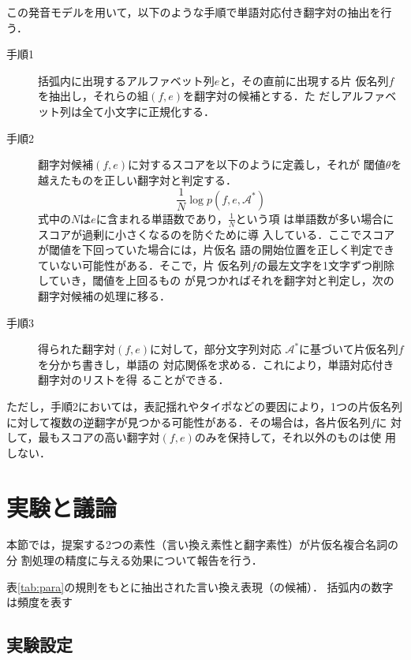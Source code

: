 \documentclass[japanese]{jnlp_1.4}
\begin{document}
この発音モデルを用いて，以下のような手順で単語対応付き翻字対の抽出を行う．
\begin{description}
 \item[手順1]
	    括弧内に出現するアルファベット列$e$と，その直前に出現する片
	    仮名列$f$を抽出し，それらの組$(f,e)$を翻字対の候補とする．た
	    だしアルファベット列は全て小文字に正規化する．
 \item[手順2]
	    翻字対候補$(f,e)$に対するスコアを以下のように定義し，それが
	    閾値$\theta$を越えたものを正しい翻字対と判定する．
	    \[
	    \frac{1}{N}\log p(f,e,\mathcal{A}^{*})
	    \]
	    式中の$N$は$e$に含まれる単語数であり，$\frac{1}{N}$という項
	    は単語数が多い場合にスコアが過剰に小さくなるのを防ぐために導
	    入している．ここでスコアが閾値を下回っていた場合には，片仮名
	    語の開始位置を正しく判定できていない可能性がある．そこで，片
	    仮名列$f$の最左文字を1文字ずつ削除していき，閾値を上回るもの
	    が見つかればそれを翻字対と判定し，次の翻字対候補の処理に移る．	    
	    
 \item[手順3]
	    得られた翻字対$(f,e)$に対して，部分文字列対応
	    $\mathcal{A}^{*}$に基づいて片仮名列$f$を分かち書きし，単語の
	    対応関係を求める．これにより，単語対応付き翻字対のリストを得
	    ることができる．
\end{description}

\noindent
ただし，手順2においては，表記揺れやタイポなどの要因により，1つの片仮名列
に対して複数の逆翻字が見つかる可能性がある．その場合は，各片仮名列$f$に
対して，最もスコアの高い翻字対$(f,e)$のみを保持して，それ以外のものは使
用しない．


\section{実験と議論} \label{sec:exp}

本節では，提案する2つの素性（言い換え素性と翻字素性）が片仮名複合名詞の分
割処理の精度に与える効果について報告を行う．

\begin{table}[b]
    \caption{表\ref{tab:para}の規則をもとに抽出された言い換え表現（の候補）．
    括弧内の数字は頻度を表す}
    \label{fig:extract-para}

\end{table}

\subsection{実験設定} \label{sec:setting}
\end{document}
